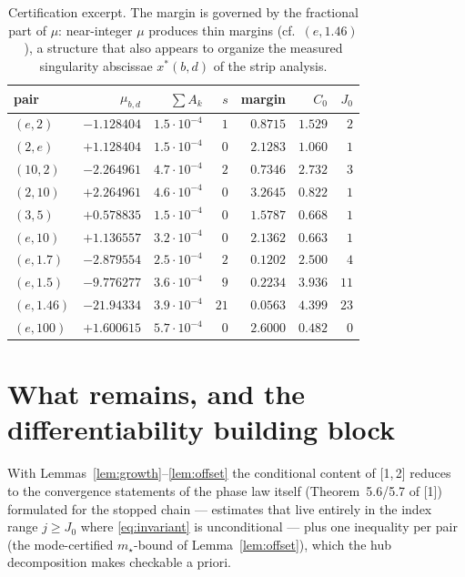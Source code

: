 \documentclass[11pt]{article}
\begin{document}
\begin{table}[h]
\centering\small
\begin{tabular}{lrrrrrr}
\toprule
pair & $\mu_{b,d}$ & $\sum A_k$ & $s$ & margin & $C_0$ & $J_0$ \\
\midrule
$(e,2)$      & $-1.128404$ & $1.5\cdot10^{-4}$ & $1$ & $0.8715$ & $1.529$ & $2$ \\
$(2,e)$      & $+1.128404$ & $1.5\cdot10^{-4}$ & $0$ & $2.1283$ & $1.060$ & $1$ \\
$(10,2)$     & $-2.264961$ & $4.7\cdot10^{-4}$ & $2$ & $0.7346$ & $2.732$ & $3$ \\
$(2,10)$     & $+2.264961$ & $4.6\cdot10^{-4}$ & $0$ & $3.2645$ & $0.822$ & $1$ \\
$(3,5)$      & $+0.578835$ & $1.5\cdot10^{-4}$ & $0$ & $1.5787$ & $0.668$ & $1$ \\
$(e,10)$     & $+1.136557$ & $3.2\cdot10^{-4}$ & $0$ & $2.1362$ & $0.663$ & $1$ \\
$(e,1.7)$    & $-2.879554$ & $2.5\cdot10^{-4}$ & $2$ & $0.1202$ & $2.500$ & $4$ \\
$(e,1.5)$    & $-9.776277$ & $3.6\cdot10^{-4}$ & $9$ & $0.2234$ & $3.936$ & $11$ \\
$(e,1.46)$   & $-21.94334$ & $3.9\cdot10^{-4}$ & $21$ & $0.0563$ & $4.399$ & $23$ \\
$(e,100)$    & $+1.600615$ & $5.7\cdot10^{-4}$ & $0$ & $2.6000$ & $0.482$ & $0$ \\
\bottomrule
\end{tabular}
\caption{Certification excerpt.  The margin is governed by the fractional
part of $\mu$: near-integer $\mu$ produces thin margins (cf.\ $(e,1.46)$),
a structure that also appears to organize the measured singularity abscissae
$x^*(b,d)$ of the strip analysis.}
\label{tab:cert}
\end{table}

\section{What remains, and the differentiability building block}

With Lemmas~\ref{lem:growth}--\ref{lem:offset} the conditional content of
[1,\,2] reduces to the convergence statements of the phase law itself
(Theorem~5.6/5.7 of [1]) formulated for the stopped chain --- estimates that
live entirely in the index range $j\ge J_0$ where \eqref{eq:invariant} is
unconditional --- plus one inequality per pair (the mode-certified
$m_\star$-bound of Lemma~\ref{lem:offset}), which the hub decomposition makes
checkable a priori.
\end{document}
